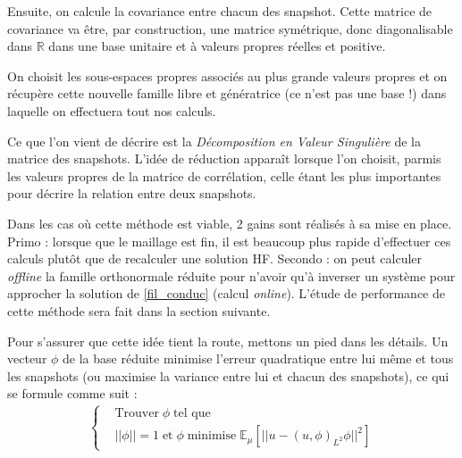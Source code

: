 \documentclass[12pt,a4paper,article]{memoir} %
\begin{document}
\vspace{0.2cm}

Ensuite, on calcule
la covariance entre chacun des snapshot. Cette matrice de covariance va être, par construction, une matrice symétrique, donc diagonalisable dans $\mathbb{R}$ dans une base unitaire et à valeurs propres réelles et positive.

\vspace{0.2cm}

On choisit les sous-espaces propres associés au plus grande valeurs propres et on récupère cette nouvelle famille libre et génératrice (ce n'est pas une base !) dans laquelle 
on effectuera tout nos calculs. 

\vspace{0.3cm}

Ce que l'on vient de décrire est la \textit{Décomposition en Valeur Singulière} de la matrice des snapshots. L'idée de réduction 
apparaît lorsque l'on choisit, parmis les valeurs propres de la matrice de corrélation, celle étant les plus importantes pour décrire la relation entre deux snapshots.

\vspace{0.3cm}

Dans les cas où cette méthode est viable, 2 gains sont réalisés à sa mise en place. Primo : lorsque que le maillage est fin, 
il est beaucoup plus rapide d'effectuer ces calculs plutôt que de recalculer une solution HF. Secondo : on peut calculer \textit{offline} la famille orthonormale réduite
pour n'avoir qu'à inverser un système pour approcher la solution de \eqref{fil_conduc} (calcul \textit{online}). L'étude de performance
de cette méthode sera fait dans la section suivante.  

\vspace{0.3cm}

Pour s'assurer que cette idée tient la route, mettons un pied dans les détails. Un vecteur $\phi$ de la base réduite 
minimise l'erreur quadratique entre lui même et tous les snapshots (ou maximise la variance entre lui et chacun des snapshots), ce qui se formule comme suit :
\begin{align*}
    \begin{cases}
        &\text{Trouver}\; \phi \; \text{tel que} \\
        &||\phi|| = 1 \; \text{et} \; \phi \; \text{minimise} \; \mathbb{E}_\mu \left[||u - \left(u, \phi\right)_{L^2} \phi ||^2 \right]
    \end{cases}
\end{align*}
\end{document}
